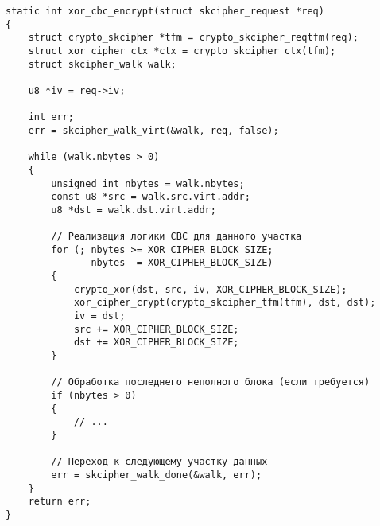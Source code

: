 \begin{verbatim}
static int xor_cbc_encrypt(struct skcipher_request *req)
{
    struct crypto_skcipher *tfm = crypto_skcipher_reqtfm(req);
    struct xor_cipher_ctx *ctx = crypto_skcipher_ctx(tfm);
    struct skcipher_walk walk;
    
    u8 *iv = req->iv;
    
    int err;
    err = skcipher_walk_virt(&walk, req, false);
    
    while (walk.nbytes > 0) 
    {
        unsigned int nbytes = walk.nbytes;
        const u8 *src = walk.src.virt.addr;
        u8 *dst = walk.dst.virt.addr;
    
        // Реализация логики CBC для данного участка
        for (; nbytes >= XOR_CIPHER_BLOCK_SIZE; 
               nbytes -= XOR_CIPHER_BLOCK_SIZE) 
        {
            crypto_xor(dst, src, iv, XOR_CIPHER_BLOCK_SIZE); 
            xor_cipher_crypt(crypto_skcipher_tfm(tfm), dst, dst); 
            iv = dst;
            src += XOR_CIPHER_BLOCK_SIZE;
            dst += XOR_CIPHER_BLOCK_SIZE;
        }
    
        // Обработка последнего неполного блока (если требуется)
        if (nbytes > 0) 
        {
            // ...
        }
        
        // Переход к следующему участку данных
        err = skcipher_walk_done(&walk, err);
    }
    return err;    
}
\end{verbatim}